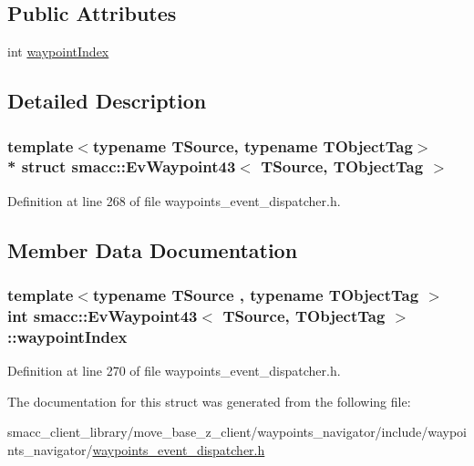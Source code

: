 \subsection*{Public Attributes}
\begin{DoxyCompactItemize}
\item 
int \hyperlink{structsmacc_1_1EvWaypoint43_a311e500a981c284caa87808669f75cf2}{waypoint\+Index}
\end{DoxyCompactItemize}


\subsection{Detailed Description}
\subsubsection*{template$<$typename T\+Source, typename T\+Object\+Tag$>$\\*
struct smacc\+::\+Ev\+Waypoint43$<$ T\+Source, T\+Object\+Tag $>$}



Definition at line 268 of file waypoints\+\_\+event\+\_\+dispatcher.\+h.



\subsection{Member Data Documentation}
\subsubsection[{\texorpdfstring{waypoint\+Index}{waypointIndex}}]{\setlength{\rightskip}{0pt plus 5cm}template$<$typename T\+Source , typename T\+Object\+Tag $>$ int {\bf smacc\+::\+Ev\+Waypoint43}$<$ T\+Source, T\+Object\+Tag $>$\+::waypoint\+Index}\hypertarget{structsmacc_1_1EvWaypoint43_a311e500a981c284caa87808669f75cf2}{}\label{structsmacc_1_1EvWaypoint43_a311e500a981c284caa87808669f75cf2}


Definition at line 270 of file waypoints\+\_\+event\+\_\+dispatcher.\+h.



The documentation for this struct was generated from the following file\+:\begin{DoxyCompactItemize}
\item 
smacc\+\_\+client\+\_\+library/move\+\_\+base\+\_\+z\+\_\+client/waypoints\+\_\+navigator/include/waypoints\+\_\+navigator/\hyperlink{waypoints__event__dispatcher_8h}{waypoints\+\_\+event\+\_\+dispatcher.\+h}\end{DoxyCompactItemize}
